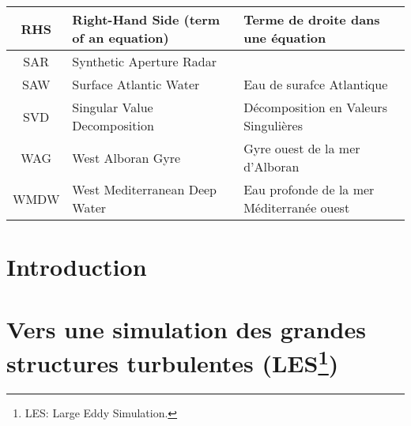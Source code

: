 \documentclass[a4paper,12pt,notitlepage,twoside]{report}
\numberwithin{equation}{section}
\begin{document}
\begin{table}[!h]
\begin{tabular}{|c|ll|}
                \hline
                RHS & Right-Hand Side (term of an equation) & Terme de droite dans une équation \\
                \hline
                SAR & Synthetic Aperture Radar & \\
                \hline
                SAW & Surface Atlantic Water & Eau de surafce Atlantique\\
                \hline
                SVD & Singular Value Decomposition & Décomposition en Valeurs Singulières  \\
                \hline
                WAG & West Alboran Gyre & Gyre ouest de la mer d'Alboran\\
                \hline
                WMDW & West Mediterranean Deep Water & Eau profonde de la mer Méditerranée ouest\\
                \hline
        \end{tabular}
\end{table}


\newpage
\chapter{Introduction}
\label{chapINTRO}
\citet{armi_1985}





\chapter[Vers une simulation des grandes structures turbulentes]{Vers une simulation des grandes structures turbulentes (LES\footnote{LES: Large Eddy Simulation.\label{LES}})}
\label{chap2}
\end{document}
